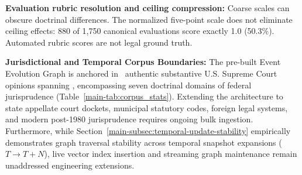 \item \textbf{Evaluation rubric resolution and ceiling compression:} Coarse scales can obscure doctrinal differences. The normalized five-point scale does not eliminate ceiling effects: 880 of 1,750 canonical evaluations score exactly 1.0 (50.3\%). Automated rubric scores are not legal ground truth.

\item \textbf{Jurisdictional and Temporal Corpus Boundaries:} The pre-built Event Evolution Graph is anchored in \CorpusTotalOpinions\ authentic substantive U.S. Supreme Court opinions spanning \CorpusTemporalSpan, encompassing seven doctrinal domains of federal jurisprudence (Table~\ref{main-tab:corpus_stats}). Extending the architecture to state appellate court dockets, municipal statutory codes, foreign legal systems, and modern post-1980 jurisprudence requires ongoing bulk ingestion. Furthermore, while Section~\ref{main-subsec:temporal-update-stability} empirically demonstrates graph traversal stability across temporal snapshot expansions ($T \to T+N$), live vector index insertion and streaming graph maintenance remain unaddressed engineering extensions.

